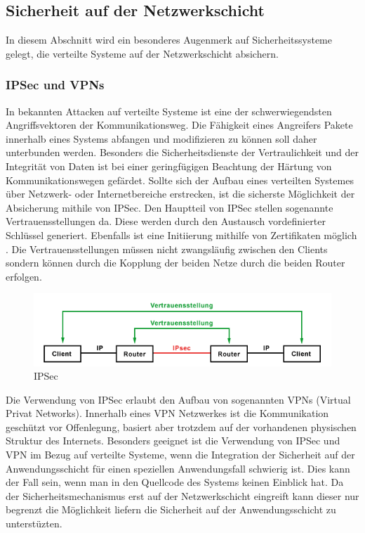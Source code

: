 \documentclass[utf8,biblatex]{lni}
\begin{document}
\subsection{Sicherheit auf der Netzwerkschicht}

In diesem Abschnitt wird ein besonderes Augenmerk auf Sicherheitssysteme gelegt, 
die verteilte Systeme auf der Netzwerkschicht absichern. 

\subsubsection{IPSec und VPNs}

In bekannten Attacken auf verteilte Systeme ist eine der schwerwiegendsten Angriffsvektoren
der Kommunikationsweg. Die Fähigkeit eines Angreifers Pakete innerhalb eines Systems abfangen und 
modifizieren zu können soll daher unterbunden werden. 
Besonders die Sicherheitsdienste der Vertraulichkeit und der Integrität von Daten ist bei 
einer geringfügigen Beachtung der Härtung von Kommunikationswegen gefärdet. 
Sollte sich der Aufbau eines verteilten Systemes über Netzwerk- oder Internetbereiche 
erstrecken, ist die sicherste Möglichkeit der Absicherung mithile von IPSec. 
Den Hauptteil von IPSec stellen sogenannte Vertrauensstellungen da. 
Diese werden durch den Austausch vordefinierter Schlüssel generiert. 
Ebenfalls ist eine Initiierung mithilfe von Zertifikaten möglich \cite{o.V.02.12.2020}.
Die Vertrauensstellungen müssen nicht zwangsläufig zwischen den Clients sondern 
können durch die Kopplung der beiden Netze durch die beiden Router erfolgen.

\begin{figure}
  \centering
  \includegraphics[width=\textwidth]{images/ipsec.png}
  \caption[IPSec]{IPSec} 
  \label{IPsec}
\end{figure}  

Die Verwendung von IPSec erlaubt den Aufbau von sogenannten VPNs (Virtual Privat Networks).
Innerhalb eines VPN Netzwerkes ist die Kommunikation geschützt vor Offenlegung, 
basiert aber trotzdem auf der vorhandenen physischen Struktur des Internets.
Besonders geeignet ist die Verwendung von IPSec und VPN im Bezug auf verteilte Systeme, 
wenn die Integration der Sicherheit auf der Anwendungsschicht für einen speziellen 
Anwendungsfall schwierig ist. Dies kann der Fall sein, wenn man in den Quellcode 
des Systems keinen Einblick hat. 
Da der Sicherheitsmechanismus erst auf der Netzwerkschicht eingreift kann dieser 
nur begrenzt die Möglichkeit liefern die Sicherheit auf der Anwendungsschicht zu unterstüzten. \cite{Rehm.29.01.2019}
\end{document}
